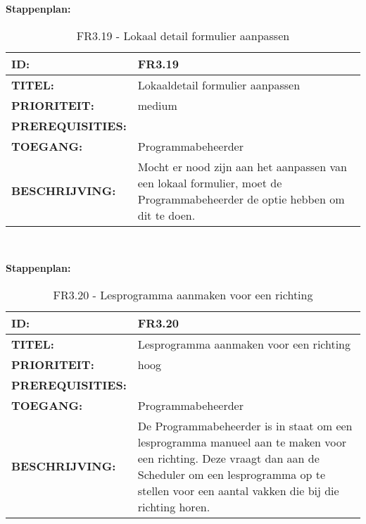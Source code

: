 \textbf{Stappenplan:}
    
\noindent\begin{table}[H]
            \begin{tabular}{l | p{10cm}}
                \textbf{ID:} & FR3.19 \\ \hline
                \textbf{TITEL:} & Lokaaldetail formulier aanpassen\\ \hline
                \textbf{PRIORITEIT:} &  medium \\ \hline
                \textbf{PREREQUISITIES:} & \\ \hline
                \textbf{TOEGANG:} & Programmabeheerder \\ \hline
                \textbf{BESCHRIJVING:} & Mocht er nood zijn aan het aanpassen van een lokaal formulier, moet de Programmabeheerder de optie hebben om dit te doen.\\ 
            \end{tabular}\\
            \caption{FR3.19 - Lokaal detail formulier aanpassen}
            \label{tab:FR3.19 - Lokaaldetail formulier aanpassen}
        \end{table}

\textbf{Stappenplan:}

\noindent\begin{table}[H]
            \begin{tabular}{l | p{10cm}}
                \textbf{ID:} & FR3.20 \\ \hline
                \textbf{TITEL:} & Lesprogramma aanmaken voor een richting\\ \hline
                \textbf{PRIORITEIT:} &  hoog \\ \hline
                \textbf{PREREQUISITIES:} & \\ \hline
                \textbf{TOEGANG:} & Programmabeheerder \\ \hline
                \textbf{BESCHRIJVING:} & De Programmabeheerder is in staat om een lesprogramma manueel aan te maken voor een richting. Deze vraagt dan aan de Scheduler om een lesprogramma op te stellen voor een aantal vakken die bij die richting horen.\\ 
            \end{tabular}\\
            \caption{FR3.20 - Lesprogramma aanmaken voor een richting}
            \label{tab:FR3.20 - Lesprogramma aanmaken voor een richting}
        \end{table}

